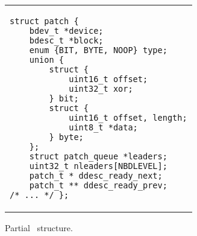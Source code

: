 \section {\ChDescs}
\label{sec:chdescs}

\newcommand{\ChAll}{\ensuremath{\textit{All}}}
\newcommand{\ChAllB}[1]{\ensuremath{\textit{All}[#1]}}
\newcommand{\ChMem}{\ensuremath{\textit{Mem}}}
\newcommand{\ChMemB}[1]{\ensuremath{\textit{Mem}[#1]}}
\newcommand{\ChDisk}{\ensuremath{\textit{Disk}}}
\newcommand{\ChDiskB}[1]{\ensuremath{\textit{Disk}[#1]}}
\newcommand{\ChInf}{\ensuremath{\textit{Inf}}}
\newcommand{\ChInfB}[1]{\ensuremath{\textit{Inf\/}[#1]}}

\newcommand{\Before}[1]{\ensuremath{\textit{Pre}[#1]}}
\newcommand{\BeforeS}[1]{\ensuremath{\textit{Pre}^*[#1]}}
\newcommand{\After}[1]{\ensuremath{\textit{Post}[#1]}}
\newcommand{\AfterS}[1]{\ensuremath{\textit{Post}^*[#1]}}

\newcommand{\statenone}{\ensuremath{\textit{cached}}}
\newcommand{\stateinf}{\ensuremath{\textit{inflight}}}
\newcommand{\statedisk}{\ensuremath{\textit{ondisk}}}

\begin{figure}[t]
\vskip-14pt
\begin{tabular}{@{\hskip0.58in}p{2in}@{}}
\begin{scriptsize}
\begin{verbatim}
struct patch {
    bdev_t *device;
    bdesc_t *block;
    enum {BIT, BYTE, NOOP} type;
    union {
        struct {
            uint16_t offset;
            uint32_t xor;
        } bit;
        struct {
            uint16_t offset, length;
            uint8_t *data;
        } byte;
    };
    struct patch_queue *leaders;
    uint32_t nleaders[NBDLEVEL];
    patch_t * ddesc_ready_next;
    patch_t ** ddesc_ready_prev;
/* ... */ };
\end{verbatim}
\end{scriptsize}
\end{tabular}
\vspace{-10pt}
\caption{\label{fig:chdesc} Partial \chdesc\ structure.}
\end{figure}


